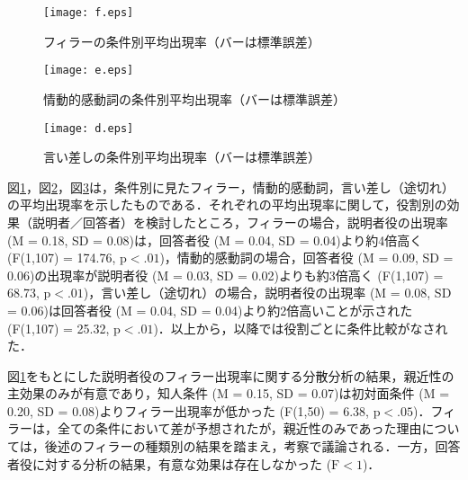 \documentclass[japanese]{jnlp_1.3a}
\begin{document}
\begin{figure}[tbh]
      \begin{center}
      \texttt{[image: f.eps]}
      \caption{フィラーの条件別平均出現率（バーは標準誤差）}
      
      \label{filler_rate}
      \end{center}
\end{figure}

\begin{figure}[t]
      \begin{center}
      \texttt{[image: e.eps]}
      \caption{情動的感動詞の条件別平均出現率（バーは標準誤差）}
      \label{affect_rate}
      \end{center}
\end{figure}

\begin{figure}[t]
      \begin{center}
      \texttt{[image: d.eps]}
      \caption{言い差しの条件別平均出現率（バーは標準誤差）}
      \label{dis_rate}
      \end{center}
\end{figure}

図\ref{filler_rate}，図\ref{affect_rate}，図\ref{dis_rate}は，条件別に見たフィラー，情動的感動詞，言い差し（途切れ）の平均出現率を示したものである．それぞれの平均出現率に関して，役割別の効果（説明者／回答者）を検討したところ，フィラーの場合，説明者役の出現率 (M = 0.18, SD = 0.08)は，回答者役 (M = 0.04, SD = 0.04)より約4倍高く (F(1,107) = 174.76, $\mathrm{p} < .01$)，情動的感動詞の場合，回答者役 (M = 0.09, SD = 0.06)の出現率が説明者役 (M = 0.03, SD = 0.02)よりも約3倍高く (F(1,107) = 68.73, $\mathrm{p} < .01$)，言い差し（途切れ）の場合，説明者役の出現率 (M = 0.08, SD = 0.06)は回答者役 (M = 0.04, SD = 0.04)より約2倍高いことが示された (F(1,107) = 25.32, $\mathrm{p} < .01$)．以上から，以降では役割ごとに条件比較がなされた．

図\ref{filler_rate}をもとにした説明者役のフィラー出現率に関する分散分析の結果，親近性の主効果のみが有意であり，知人条件 (M = 0.15, SD = 0.07)は初対面条件 (M = 0.20, SD = 0.08)よりフィラー出現率が低かった (F(1,50) = 6.38, $\mathrm{p} < .05$)．フィラーは，全ての条件において差が予想されたが，親近性のみであった理由については，後述のフィラーの種類別の結果を踏まえ，考察で議論される．一方，回答者役に対する分析の結果，有意な効果は存在しなかった ($\mathrm{F} < 1$)．
\end{document}

